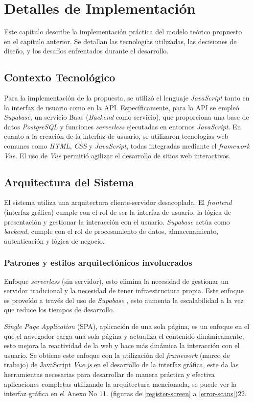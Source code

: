 \chapter{Detalles de Implementación}\label{chapter:implementation}
Este capítulo describe la implementación práctica del modelo teórico propuesto en el capítulo anterior. Se detallan las tecnologías utilizadas, las decisiones de diseño, y los desafíos enfrentados durante el desarrollo.


\section{Contexto Tecnol\'ogico}
Para la implementación de la propuesta, se utilizó el lenguaje \textit{JavaScript} tanto en la interfaz de usuario como en la API. Específicamente, para la API se empleó \textit{Supabase}, un servicio Baas (\textit{Backend} como servicio), que proporciona una base de datos \textit{PostgreSQL} y funciones \textit{serverless} ejecutadas en entornos \textit{JavaScript}. En cuanto a la creación de la interfaz de usuario, se utilizaron tecnologías web comunes como \textit{HTML}, \textit{CSS} y \textit{JavaScript}, todas integradas mediante el \textit{framework} \textit{Vue}. El uso de \textit{Vue} permitió agilizar el desarrollo de sitios web interactivos. 

\section{Arquitectura del Sistema}
El sistema utiliza una arquitectura cliente-servidor desacoplada. El \textit{frontend} (interfaz gr\'afica) cumple con el rol de ser la interfaz de usuario, la l\'ogica de presentaci\'on y gestionar la interacci\'on con el usuario. \textit{Supabase} \cite{supabase} act\'ua como \textit{backend}, cumple con el rol de procesamiento de datos, almacenamiento, autenticaci\'on y l\'ogica de negocio.

\subsection{Patrones y estilos arquitect\'onicos involucrados}
Enfoque \textit{serverless} (sin servidor), esto elimina la necesidad de gestionar un servidor tradicional y la necesidad de tener infraestructura propia. Este enfoque es prove\'ido a trav\'es del uso de \textit{Supabase} \cite{supabase}, esto aumenta la escalabilidad a la vez que reduce los tiempos de desarrollo.

\textit{Single Page Application} (SPA), aplicaci\'on de una sola p\'agina, es un enfoque en el que el navegador carga una sola p\'agina y actualiza el contenido din\'amicamente, esto mejora la reactividad de la web y hace m\'as din\'amica la interacci\'on con el usuario. Se obtiene este enfoque con la utilizaci\'on del \textit{framework} (marco de trabajo) de JavaScript \textit{Vue.js} \cite{vuejs} en el desarrollo de la interfaz gr\'afica, este  da las herramientas necesarias para desarrollar de manera pr\'actica y efectiva aplicaciones completas utilizando la arquitectura mencionada, se puede ver la interfaz gr\'afica en el Anexo No 11. (figuras de \ref{register-screen} a \ref{error-scans})22.


